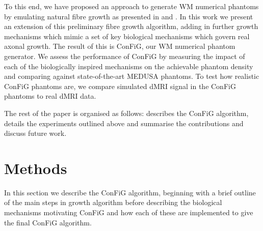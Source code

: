 To this end, we have proposed an approach to generate \ac{WM} numerical phantoms by emulating natural fibre growth as presented in  and \cite{Callaghan2019}. In this work we present an extension of this preliminary fibre growth algorithm, adding in further growth mechanisms which mimic a set of key biological mechanisms which govern real axonal growth.
The result of this is \acf{ConFiG}, our \ac{WM} numerical phantom generator.
We assess the performance of \ac{ConFiG} by measuring the impact of each of the biologically inspired mechanisms on the achievable phantom density and comparing against state-of-the-art MEDUSA phantoms.
To test how realistic \ac{ConFiG} phantoms are, we compare simulated \ac{dMRI} signal in the \ac{ConFiG} phantoms to real \ac{dMRI} data.

The rest of the paper is organised as follows:  describes the \ac{ConFiG} algorithm,  details the experiments outlined above and  summarise the contributions and discuss future work.

\section{Methods}
\label{sec:config_methods}
In this section we describe the \ac{ConFiG} algorithm, beginning with a brief outline of the main steps in growth algorithm before describing the biological mechanisms motivating \ac{ConFiG} and how each of these are implemented to give the final \ac{ConFiG} algorithm.

